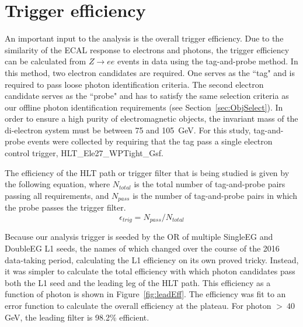 \section{Trigger efficiency}
\label{sec:trigEff}
An important input to the analysis is the overall trigger efficiency. Due to the similarity of the ECAL response 
to electrons and photons, the trigger efficiency can be calculated from 
$Z\rightarrow ee$ events in data using the tag-and-probe method. In this method, two electron candidates
are required. One serves as the ``tag" and is required to pass loose photon identification criteria. 
The second electron candidate serves
as the ``probe" and has to satisfy the same selection criteria as our offline photon identification requirements (see Section~\ref{sec:ObjSelect}). 
In order to ensure a high purity of electromagnetic objects, the invariant mass of the di-electron system must be between 75 and 105~GeV. 
For this study, tag-and-probe events were collected by requiring that the tag pass
a single electron control trigger, HLT\_Ele27\_WPTight\_Gsf.


The efficiency of the HLT path or trigger filter that is being studied is given by the following equation, where $N_{total}$ is the total number of tag-and-probe pairs 
passing all requirements, and $N_{pass}$ is the number of tag-and-probe pairs in which  the probe passes the trigger filter.
\begin{equation}
 \epsilon_{trig} = N_{pass} / N_{total}
\end{equation}

Because our analysis trigger is seeded by the OR of multiple SingleEG and DoubleEG L1 seeds, the names of which changed over the course of the 2016 data-taking period, calculating the L1 efficiency on its own proved tricky. Instead, it was simpler to calculate the total efficiency with which photon candidates pass both the L1 seed and the leading leg of the HLT path. This efficiency as a function of photon \pt is shown in Figure~\ref{fig:leadEff}. The efficiency was fit to an error function to calculate the overall efficiency at the plateau. For photon \pt $>~40$ GeV, the leading filter is 98.2\% efficient.

